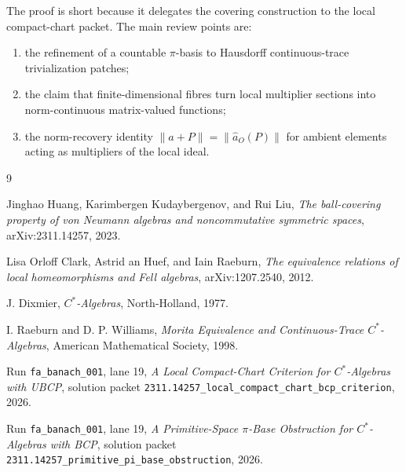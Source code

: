 \documentclass[11pt]{article}
\begin{document}
The proof is short because it delegates the covering construction to the
local compact-chart packet.  The main review points are:
\begin{enumerate}
    \item the refinement of a countable \(\pi\)-basis to Hausdorff
          continuous-trace trivialization patches;
    \item the claim that finite-dimensional fibres turn local multiplier
          sections into norm-continuous matrix-valued functions;
    \item the norm-recovery identity
          \(\|a+P\|=\|\widehat a_O(P)\|\) for ambient elements acting as
          multipliers of the local ideal.
\end{enumerate}

\begin{thebibliography}{9}

Jinghao Huang, Karimbergen Kudaybergenov, and Rui Liu,
\emph{The ball-covering property of von Neumann algebras and noncommutative
symmetric spaces},
arXiv:2311.14257, 2023.

Lisa Orloff Clark, Astrid an Huef, and Iain Raeburn,
\emph{The equivalence relations of local homeomorphisms and Fell algebras},
arXiv:1207.2540, 2012.

J. Dixmier,
\emph{\(C^*\)-Algebras},
North-Holland, 1977.

I. Raeburn and D. P. Williams,
\emph{Morita Equivalence and Continuous-Trace \(C^*\)-Algebras},
American Mathematical Society, 1998.

Run \texttt{fa\_banach\_001}, lane 19,
\emph{A Local Compact-Chart Criterion for \(C^*\)-Algebras with UBCP},
solution packet
\texttt{2311.14257\_local\_compact\_chart\_bcp\_criterion}, 2026.

Run \texttt{fa\_banach\_001}, lane 19,
\emph{A Primitive-Space \(\pi\)-Base Obstruction for \(C^*\)-Algebras with
BCP},
solution packet
\texttt{2311.14257\_primitive\_pi\_base\_obstruction}, 2026.

\end{thebibliography}
\end{document}
